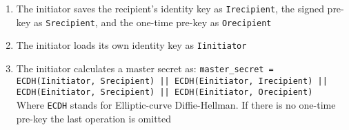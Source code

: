 \begin{itemize}
\begin{enumerate}
		\item The initiator saves the recipient's identity key as \texttt{Irecipient}, the signed pre-key as \texttt{Srecipient}, and the one-time pre-key as \texttt{Orecipient}
		\item The initiator loads its own identity key as \texttt{Iinitiator}
		\item The initiator calculates a master secret as: \texttt{master\_secret = ECDH(Iinitiator, Srecipient) || ECDH(Einitiator, Irecipient) || ECDH(Einitiator, Srecipient) || ECDH(Einitiator, Orecipient)}\\
		Where \texttt{ECDH} stands for Elliptic-curve Diffie-Hellman. If there is no one-time pre-key the last operation is omitted
	\end{enumerate}
\end{itemize}